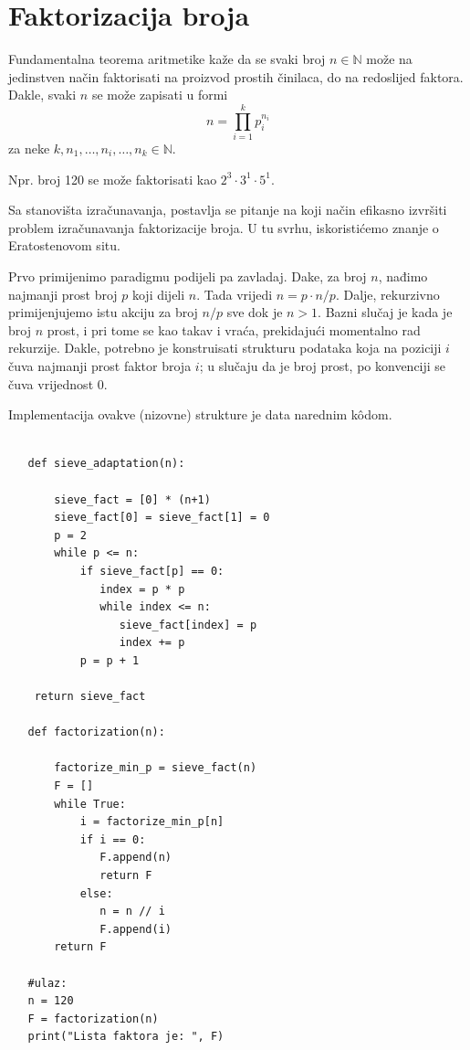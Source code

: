 \section{Faktorizacija broja}

Fundamentalna teorema aritmetike kaže da se svaki broj $n \in \mathbb{N}$ može na jedinstven način faktorisati na proizvod prostih činilaca, do na redoslijed faktora. Dakle, svaki $n$ se može zapisati u formi
 $$n = \prod_{i=1}^k p_i^{n_i}$$
 za neke $k, n_1,\ldots, n_i, \ldots, n_k \in \mathbb{N}$.
 
 Npr. broj 120 se može faktorisati kao $2^3 \cdot 3^1 \cdot 5^1$.
 
 Sa stanovišta izračunavanja, postavlja se pitanje na koji način efikasno izvršiti problem izračunavanja faktorizacije broja.  U tu svrhu, iskoristićemo znanje o Eratostenovom situ. 
 
 Prvo primijenimo paradigmu podijeli pa zavladaj. Dake, za broj $n$, nađimo najmanji prost broj $p$ koji dijeli $n$. Tada vrijedi $n = p \cdot n/p$. Dalje, rekurzivno primijenjujemo istu akciju za broj $n/p$ sve dok je $n>1$. Bazni slučaj je kada je broj $n$ prost, i pri tome se kao takav i vraća, prekidajući momentalno rad rekurzije. Dakle, potrebno je konstruisati strukturu podataka  koja na poziciji $i$ čuva najmanji prost faktor broja $i$; u slučaju da je broj prost, po konvenciji se čuva vrijednost 0.
 
 Implementacija ovakve (nizovne) strukture je data narednim k\^odom. 
 
 \begin{verbatim}
 
   def sieve_adaptation(n):
   
       sieve_fact = [0] * (n+1)
       sieve_fact[0] = sieve_fact[1] = 0
       p = 2
       while p <= n:
           if sieve_fact[p] == 0:
       		  index = p * p
       		  while index <= n:
       			 sieve_fact[index] = p
       			 index += p
           p = p + 1
 	
	return sieve_fact
 	
   def factorization(n):
       
       factorize_min_p = sieve_fact(n)
       F = []
       while True: 
           i = factorize_min_p[n]
           if i == 0: 
              F.append(n)
              return F
           else:
              n = n // i
              F.append(i)
       return F  
   
   #ulaz: 
   n = 120
   F = factorization(n)
   print("Lista faktora je: ", F)
 \end{verbatim} 
 
